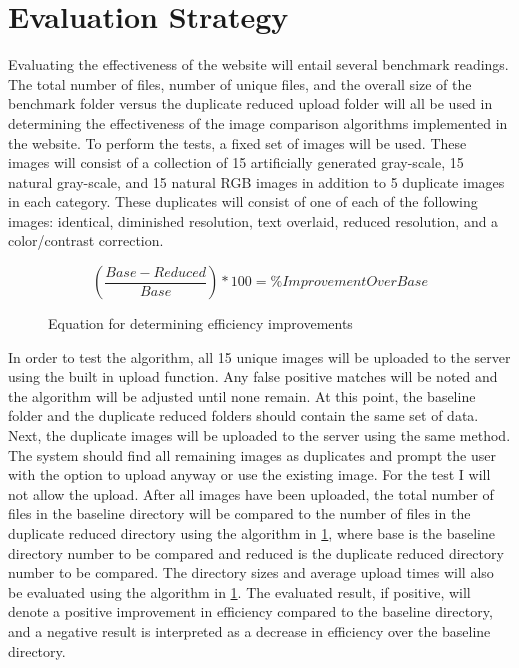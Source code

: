 \documentclass[11pt]{article}
\begin{document}
\vspace*{-.2in}
\section{Evaluation Strategy}
\label{sec:evaluate}
\vspace*{-.1in}


Evaluating the effectiveness of the website will entail several benchmark readings. The total number of files, number of unique files, and the overall size of the benchmark folder versus the duplicate reduced upload folder will all be used in determining the effectiveness of the image comparison algorithms implemented in the website. To perform the tests, a fixed set of images will be used. These images will consist of a collection of 15 artificially generated gray-scale, 15 natural gray-scale, and 15 natural RGB images in addition to 5 duplicate images in each category. These duplicates will consist of one of each of the following images: identical, diminished resolution, text overlaid, reduced resolution, and a color/contrast correction.

\begin{figure}[htbp]
\centering
\[\left ( \frac{Base - Reduced}{Base} \right ) * 100 = \% Improvement Over Base\]
\caption{Equation for determining efficiency improvements}
\label{benchmark_eq}
\end{figure}

In order to test the algorithm, all 15 unique images will be uploaded to the server using the built in upload function. Any false positive matches will be noted and the algorithm will be adjusted until none remain. At this point, the baseline folder and the duplicate reduced folders should contain the same set of data. Next, the duplicate images will be uploaded to the server using the same method. The system should find all remaining images as duplicates and prompt the user with the option to upload anyway or use the existing image. For the test I will not allow the upload. After all images have been uploaded, the total number of files in the baseline directory will be compared to the number of files in the duplicate reduced directory using the algorithm in \ref{benchmark_eq}, where base is the baseline directory number to be compared and reduced is the duplicate reduced directory number to be compared.  The directory sizes and average upload times will also be evaluated using the algorithm in \ref{benchmark_eq}. The evaluated result, if positive, will denote a positive improvement in efficiency compared to the baseline directory, and a negative result is interpreted as a decrease in efficiency over the baseline directory.
\end{document}
